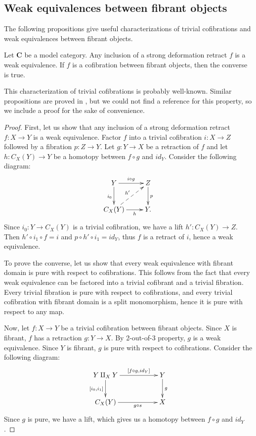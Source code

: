 \documentclass[reqno]{amsart}
\theoremstyle{definition}
\newcommand{\cat}[1]{\mathbf{#1}}
\newcommand{\C}{\cat{C}}
\newcommand{\cyli}{i}
\begin{document}
\subsection{Weak equivalences between fibrant objects}

The following propositions give useful characterizations of trivial
cofibrations and weak equivalences between fibrant objects.

\begin{prop}
Let $\C$ be a model category.
Any inclusion of a strong deformation retract $f$ is a weak equivalence.
If $f$ is a cofibration between fibrant objects, then the converse is true.
\end{prop}

This characterization of trivial cofibrations is probably well-known.
Similar propositions are proved in \cite{hirschhorn}, but we could not find a reference for this property, so we include a proof for the sake of convenience.

\begin{proof}
First, let us show that any inclusion of a strong deformation retract $f : X \to Y$ is a weak equivalence.
Factor $f$ into a trivial cofibration $i : X \to Z$ followed by a fibration $p : Z \to Y$.
Let $g : Y \to X$ be a retraction of $f$ and let $h : C_X(Y) \to Y$ be a homotopy between $f \circ g$ and $id_Y$.
Consider the following diagram:
\[ \xymatrix{ Y \ar[r]^{i \circ g} \ar[d]_{\cyli_0} & Z \ar[d]^p \\
              C_X(Y) \ar[r]_-h \ar@{-->}[ur]^{h'}   & Y.
            } \]
Since $\cyli_0 : Y \to C_X(Y)$ is a trivial cofibration, we have a lift $h' : C_X(Y) \to Z$.
Then $h' \circ \cyli_1 \circ f = i$ and $p \circ h' \circ \cyli_1 = id_Y$, thus $f$ is a retract of $i$, hence a weak equivalence.

To prove the converse, let us show that every weak equivalence with fibrant domain is pure with respect to cofibrations.
This follows from the fact that every weak equivalence can be factored into a trivial cofibrant and a trivial fibration.
Every trivial fibration is pure with respect to cofibrations, and every trivial cofibration with fibrant domain is a split monomorphism,
hence it is pure with respect to any map.

Now, let $f : X \to Y$ be a trivial cofibration between fibrant objects.
Since $X$ is fibrant, $f$ has a retraction $g : Y \to X$.
By 2-out-of-3 property, $g$ is a weak equivalence.
Since $Y$ is fibrant, $g$ is pure with respect to cofibrations.
Consider the following diagram:
\[ \xymatrix{ Y \amalg_X Y \ar[rr]^-{[f \circ g, id_Y]} \ar[d]_{[\cyli_0,\cyli_1]} & & Y \ar[d]^g \\
              C_X(Y) \ar[rr]_-{g \circ s} & & X
            } \]
Since $g$ is pure, we have a lift, which gives us a homotopy between $f \circ g$ and $id_Y$.
\end{proof}
\end{document}
